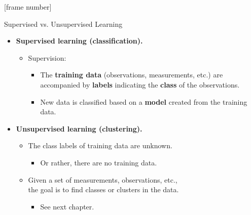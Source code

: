 \documentclass[aspectratio=169,t,table]{beamer}
\begin{document}
  {
    [frame number]
    \begin{frame}{Supervised vs. Unsupervised Learning}
        \begin{itemize}
            \item \textbf{\color{airforceblue}Supervised learning (classification).}
            \begin{itemize}
              \item Supervision:
              \begin{itemize}
                \item The \textbf{training data} (observations, measurements, etc.) are accompanied by \textbf{labels} indicating the \textbf{class} of the observations.
                \item New data is classified based on a \textbf{model} created from the training data.
              \end{itemize}
            \end{itemize}
            \item \textbf{\color{airforceblue}Unsupervised learning (clustering).}
            \begin{itemize}
              \item The class labels of training data are unknown.
              \begin{itemize}
                \item Or rather, there are no training data.
              \end{itemize}
            \end{itemize}
            \begin{itemize}
              \item Given a set of measurements, observations, etc., \\ the goal is to find classes or clusters in the data.
              \begin{itemize}
                \item See next chapter.
              \end{itemize}
            \end{itemize}
        \end{itemize}
    \end{frame}
  }
\end{document}
